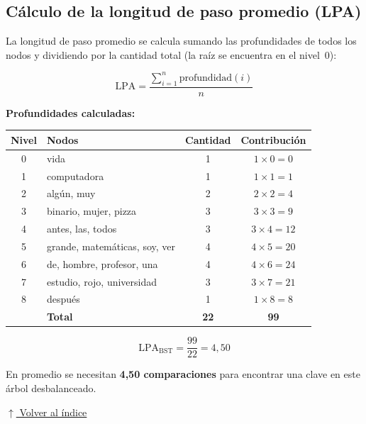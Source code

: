 \documentclass[12pt]{article}
\newcommand{\volverindice}{%
    \vspace{1em}%
    \begin{flushright}%
        \hyperlink{indice}{\small $\uparrow$ Volver al índice}%
    \end{flushright}%
}
\begin{document}
\newpage
\subsection*{Cálculo de la longitud de paso promedio (LPA)}

La longitud de paso promedio se calcula sumando las profundidades de todos los nodos
y dividiendo por la cantidad total (la raíz se encuentra en el nivel~0):

\[
\text{LPA} = \frac{\displaystyle\sum_{i=1}^{n} \text{profundidad}(i)}{n}
\]

\textbf{Profundidades calculadas:}

\begin{center}
\begin{tabular}{clcc}
\toprule
\textbf{Nivel} & \textbf{Nodos} & \textbf{Cantidad} & \textbf{Contribución} \\
\midrule
0 & vida                                            & 1 & $1 \times 0 = 0$  \\
1 & computadora                                     & 1 & $1 \times 1 = 1$  \\
2 & algún, muy                                      & 2 & $2 \times 2 = 4$  \\
3 & binario, mujer, pizza                           & 3 & $3 \times 3 = 9$  \\
4 & antes, las, todos                               & 3 & $3 \times 4 = 12$ \\
5 & grande, matemáticas, soy, ver                   & 4 & $4 \times 5 = 20$ \\
6 & de, hombre, profesor, una                       & 4 & $4 \times 6 = 24$ \\
7 & estudio, rojo, universidad                      & 3 & $3 \times 7 = 21$ \\
8 & después                                         & 1 & $1 \times 8 = 8$  \\
\midrule
  & \textbf{Total}                                  & \textbf{22} & \textbf{99} \\
\bottomrule
\end{tabular}
\end{center}

\[
\text{LPA}_{\text{BST}} = \frac{99}{22} = 4{,}50
\]

En promedio se necesitan \textbf{4,50 comparaciones} para encontrar una clave
en este árbol desbalanceado.

\volverindice

\newpage
\end{document}
